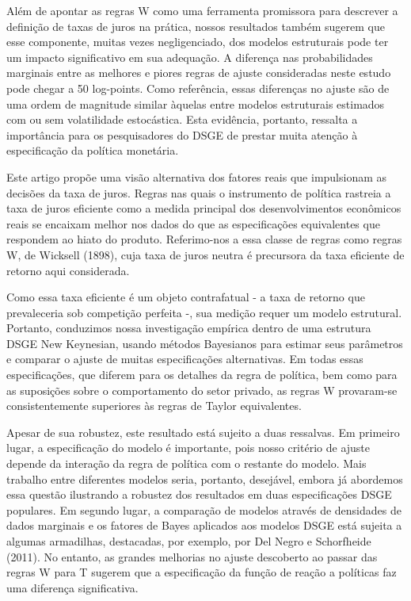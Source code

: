 Além de apontar as regras W como uma ferramenta promissora para descrever a definição de taxas de juros na prática, nossos resultados também sugerem que esse componente, muitas vezes negligenciado, dos modelos estruturais pode ter um impacto significativo em sua adequação. A diferença nas probabilidades marginais entre as melhores e piores regras de ajuste consideradas neste estudo pode chegar a 50 log-points. Como referência, essas diferenças no ajuste são de uma ordem de magnitude similar àquelas entre modelos estruturais estimados com ou sem volatilidade estocástica. Esta evidência, portanto, ressalta a importância para os pesquisadores do DSGE de prestar muita atenção à especificação da política monetária.

Este artigo propõe uma visão alternativa dos fatores reais que impulsionam as decisões da taxa de juros. Regras nas quais o instrumento de política rastreia a taxa de juros eficiente como a medida principal dos desenvolvimentos econômicos reais se encaixam melhor nos dados do que as especificações equivalentes que respondem ao hiato do produto. Referimo-nos a essa classe de regras como regras W, de Wicksell (1898), cuja taxa de juros neutra é precursora da taxa eficiente de retorno aqui considerada.

Como essa taxa eficiente é um objeto contrafatual - a taxa de retorno que prevaleceria sob competição perfeita -, sua medição requer um modelo estrutural. Portanto, conduzimos nossa investigação empírica dentro de uma estrutura DSGE New Keynesian, usando métodos Bayesianos para estimar seus parâmetros e comparar o ajuste de muitas especificações alternativas. Em todas essas especificações, que diferem para os detalhes da regra de política, bem como para as suposições sobre o comportamento do setor privado, as regras W provaram-se consistentemente superiores às regras de Taylor equivalentes.

Apesar de sua robustez, este resultado está sujeito a duas ressalvas. Em primeiro lugar, a especificação do modelo é importante, pois nosso critério de ajuste depende da interação da regra de política com o restante do modelo. Mais trabalho entre diferentes modelos seria, portanto, desejável, embora já abordemos essa questão ilustrando a robustez dos resultados em duas especificações DSGE populares. Em segundo lugar, a comparação de modelos através de densidades de dados marginais e os fatores de Bayes aplicados aos modelos DSGE está sujeita a algumas armadilhas, destacadas, por exemplo, por Del Negro e Schorfheide (2011). No entanto, as grandes melhorias no ajuste descoberto ao passar das regras W para T sugerem que a especificação da função de reação a políticas faz uma diferença significativa.

